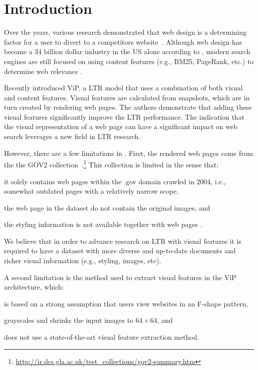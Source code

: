 
\section{Introduction}
Over the years, various research demonstrated that web design is a determining factor for a user to divert to a competitors website~\cite{nielsen1999designing,nielsen2006f,pernice2017f,wang2014eye}.
Although web design has become a 34 billion dollar industry in the US alone according to \citet{ibisdesign}, modern search engines are still focused on using content features (e.g., BM25, PageRank, etc.) to determine web relevance . 

Recently \citet{fan2017learning} introduced ViP, a \ac{LTR} model that uses a combination of both visual and content features.
Visual features are calculated from snapshots, which are in turn created by rendering web pages.
The authors demonstrate that adding these visual features significantly improve the \ac{LTR} performance.
The indication that the visual representation of a web page can have a significant impact on web search leverages a new field in \ac{LTR} research.

However, there are a few limitations in \cite{fan2017learning}.
First, the rendered web pages come from the the GOV2 collection~.\footnote{\url{http://ir.dcs.gla.ac.uk/test_collections/gov2-summary.htm}}
This collection is limited in the sense that:
\begin{inparaenum}[(i)]
\item it solely contains web pages within the .gov domain crawled in 2004, i.e., somewhat outdated pages with a relatively narrow scope,
\item the web page in the dataset do not contain the original images, and
\item the styling information is not available together with web pages .
\end{inparaenum}
We believe that in order to advance research on \ac{LTR} with visual features it is required to have a dataset with more diverse and up-to-date documents and richer visual information (e.g., styling, images, etc).

A second limitation is the method used to extract visual features in the ViP architecture, which: 
\begin{inparaenum}[(i)]
\item is based on a strong assumption that users view websites in an F-shape pattern, 
\item grayscales and shrinks the input images to $64\times64$, and
\item does not use a state-of-the-art visual feature extraction method.
\end{inparaenum}

